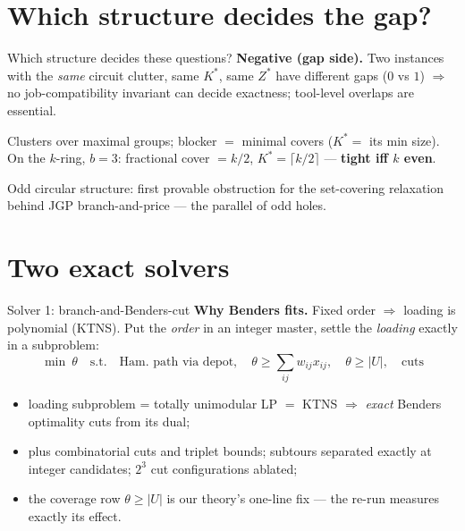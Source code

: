 \documentclass[10pt]{beamer}
\newcommand{\U}{U}\newcommand{\Kst}{K^{\ast}}\newcommand{\Zst}{Z^{\ast}}
\begin{document}
\section{Which structure decides the gap?}
\begin{frame}{Which structure decides these questions?}
\textbf{Negative (gap side).} Two instances with the \emph{same} circuit
clutter, same $\Kst$, same $\Zst$ have different gaps ($0$ vs $1$)
$\Rightarrow$ no job-compatibility invariant can decide exactness;
tool-level overlaps are essential.
\vspace{2mm}
\begin{theorem}
Clusters over maximal groups; blocker $=$ minimal covers ($\Kst=$ its min
size). On the $k$-ring, $b=3$: fractional cover $=k/2$, $\Kst=\lceil
k/2\rceil$ --- \textbf{tight iff $k$ even}.
\end{theorem}
Odd circular structure: first provable obstruction for the set-covering
relaxation behind JGP branch-and-price --- the parallel of odd holes.
\end{frame}

\section{Two exact solvers}
\begin{frame}{Solver 1: branch-and-Benders-cut}
\textbf{Why Benders fits.} Fixed order $\Rightarrow$ loading is polynomial
(KTNS). Put the \emph{order} in an integer master, settle the \emph{loading}
exactly in a subproblem:
\[
  \min\ \theta \quad\text{s.t.}\quad \text{Ham.\ path via depot},\quad
  \theta\ge\textstyle\sum_{ij} w_{ij}x_{ij},\quad \theta\ge|\U|,\quad
  \text{cuts}
\]
\begin{itemize}
  \item loading subproblem = totally unimodular LP $=$ KTNS $\Rightarrow$
        \emph{exact} Benders optimality cuts from its dual;
  \item plus combinatorial cuts and triplet bounds; subtours separated
        exactly at integer candidates; $2^3$ cut configurations ablated;
  \item the coverage row $\theta\ge|\U|$ is our theory's one-line fix ---
        the re-run measures exactly its effect.
\end{itemize}
\end{frame}
\end{document}
